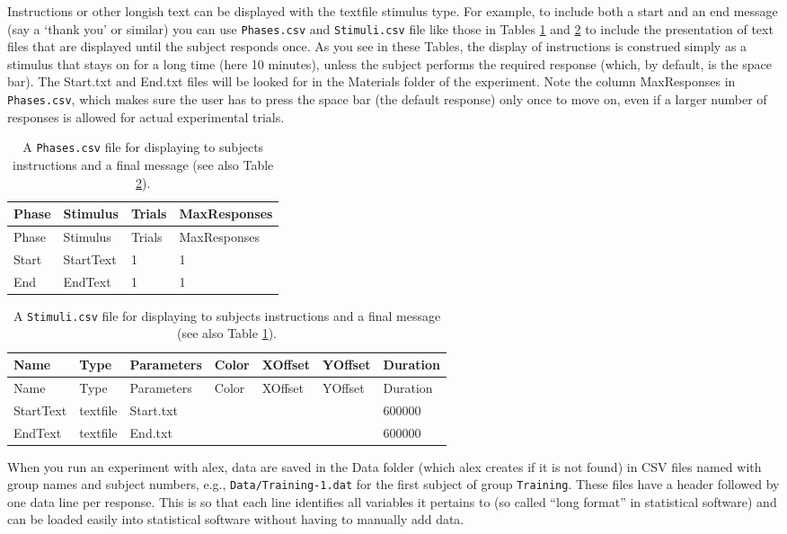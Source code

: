 \documentclass[11pt,]{article}
\begin{document}
Instructions or other longish text can be displayed with the textfile
stimulus type. For example, to include both a start and an end message
(say a `thank you' or similar) you can use \texttt{Phases.csv} and
\texttt{Stimuli.csv} file like those in Tables \ref{phases-instructions}
and \ref{stimuli-instructions} to include the presentation of text files
that are displayed until the subject responds once. As you see in these
Tables, the display of instructions is construed simply as a stimulus
that stays on for a long time (here 10 minutes), unless the subject
performs the required response (which, by default, is the space bar).
The Start.txt and End.txt files will be looked for in the Materials
folder of the experiment. Note the column MaxResponses in
\texttt{Phases.csv}, which makes sure the user has to press the space
bar (the default response) only once to move on, even if a larger number
of responses is allowed for actual experimental trials.

\begin{longtable}[c]{@{}llll@{}}
\caption{A \texttt{Phases.csv} file for displaying to subjects
instructions and a final message (see also Table
\ref{stimuli-instructions}). \label{phases-instructions}}\tabularnewline
\toprule
Phase & Stimulus & Trials & MaxResponses\tabularnewline
\midrule
\endfirsthead
\toprule
Phase & Stimulus & Trials & MaxResponses\tabularnewline
\midrule
\endhead
Start & StartText & 1 & 1\tabularnewline
End & EndText & 1 & 1\tabularnewline
\bottomrule
\end{longtable}

\begin{longtable}[c]{@{}lllllll@{}}
\caption{A \texttt{Stimuli.csv} file for displaying to subjects
instructions and a final message (see also Table
\ref{phases-instructions}). \label{stimuli-instructions}}\tabularnewline
\toprule
Name & Type & Parameters & Color & XOffset & YOffset &
Duration\tabularnewline
\midrule
\endfirsthead
\toprule
Name & Type & Parameters & Color & XOffset & YOffset &
Duration\tabularnewline
\midrule
\endhead
StartText & textfile & Start.txt & & & & 600000\tabularnewline
EndText & textfile & End.txt & & & & 600000\tabularnewline
\bottomrule
\end{longtable}


When you run an experiment with alex, data are saved in the Data folder
(which alex creates if it is not found) in CSV files named with group
names and subject numbers, e.g., \texttt{Data/Training-1.dat} for the
first subject of group \texttt{Training}. These files have a header
followed by one data line per response. This is so that each line
identifies all variables it pertains to (so called ``long format'' in
statistical software) and can be loaded easily into statistical software
without having to manually add data.
\end{document}
